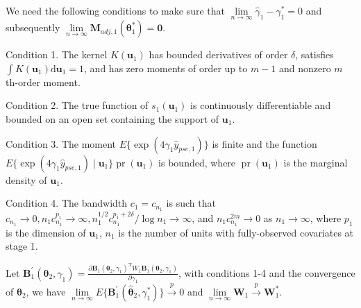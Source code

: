 \documentclass[12pt]{article}
\DeclareMathOperator{\pr}{pr}
\begin{document}
We need the following conditions to make sure that $\lim\limits_{n\to \infty}\widehat{\gamma}_1 - \gamma_1^* = 0$ and subsequently $\lim\limits_{n\to \infty}\bm{M}_{adj,1}(\bm{\theta}_1^*) = \bm{0}$.

Condition 1. The kernel $K(\bm{u}_1)$ has bounded derivatives of order $\delta$, satisfies $\int K(\bm{u}_1) \mathrm{d} \bm{u}_1=1$, and has zero moments of order up to $m-1$ and nonzero $m$ th-order moment.

Condition 2. The true function of $s_1(\bm{u}_1)$ is continuously differentiable and bounded on an open set containing the support of $\bm{u}_1$.

Condition 3. The moment $E\{\exp (4 \gamma_1 \widehat{y}_{pse,1})\}$ is finite and the function $E\{\exp (4 \gamma_1 \widehat{y}_{pse,1}) \mid \bm{u}_1\} \pr(\bm{u}_1)$ is bounded, where $\pr(\bm{u}_1)$ is the marginal density of $\bm{u}_1$.

Condition 4. The bandwidth $c_1=c_{n_1}$ is such that $c_{n_1} \rightarrow 0, n_1 c_{n_1}^{p_1} \rightarrow \infty, n_1^{1 / 2} c_{n_1}^{p_1+2 \delta} / \log n_1 \rightarrow \infty$, and $n_1 c_{n_1}^{2 m} \rightarrow 0$ as $n_1 \rightarrow \infty$, where $p_1$ is the dimension of $\bm{u}_1$, $n_1$ is the number of units with fully-observed covariates at stage 1.

Let $\bm{B}_1^{\prime}(\bm{\theta}_2,\gamma_1) = \frac{\partial \bm{B}_1(\bm{\theta}_2,\gamma_1)^{\mathrm{T}}W_1\bm{B}_1(\bm{\theta}_2,\gamma_1)}{\partial \gamma_1}$, with conditions 1-4 and the convergence of $\bm{\theta}_2$, we have $\lim\limits_{n\to \infty}E\{\bm{B}_1^{\prime}(\widehat{\bm{\theta}}_2,\gamma_1^*)\}\stackrel{p}{\longrightarrow}0$ and $\lim\limits_{n\to \infty} \bm{W}_1 \stackrel{p}{\longrightarrow} \bm{W}_1^*$. 
\end{document}
